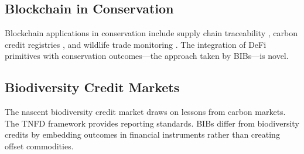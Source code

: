 \subsection{Blockchain in Conservation}

Blockchain applications in conservation include supply chain
traceability \citep{howson2019crypto}, carbon credit registries
\citep{schletz2020blockchain}, and wildlife trade monitoring
\citep{dalton2020blockchain}. The integration of DeFi primitives with
conservation outcomes---the approach taken by BIBs---is novel.

\subsection{Biodiversity Credit Markets}

The nascent biodiversity credit market draws on lessons from carbon
markets. The TNFD framework \citep{tnfd2023framework} provides reporting
standards. BIBs differ from biodiversity credits by embedding outcomes in
financial instruments rather than creating offset commodities.


